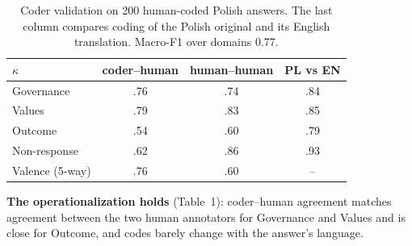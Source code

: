 \documentclass[10pt,twocolumn]{article}
\begin{document}
\begin{table}[h]\centering\small\setlength{\tabcolsep}{4pt}
\begin{tabular}{@{}lccc@{}}\toprule
$\kappa$ & coder--human & human--human & PL vs EN \\ \midrule
Governance & .76 & .74 & .84 \\
Values & .79 & .83 & .85 \\
Outcome & .54 & .60 & .79 \\
Non-response & .62 & .86 & .93 \\
Valence (5-way) & .76 & .60 & -- \\ \bottomrule
\end{tabular}
\caption{Coder validation on 200 human-coded Polish answers. The last column compares coding of the Polish original and its English translation. Macro-F1 over domains 0.77.}
\end{table}

\textbf{The operationalization holds} (Table~1): coder--human agreement matches agreement between the two human annotators for Governance and Values and is close for Outcome, and codes barely change with the answer's language.
\end{document}
